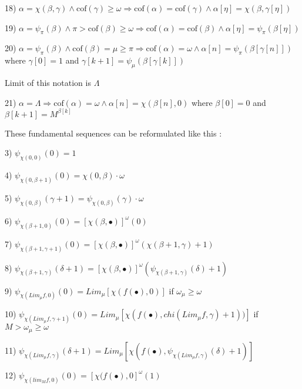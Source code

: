 \documentclass[10pt]{article}
\begin{document}
\bigskip

18) \(\alpha=\chi(\beta,\gamma) \wedge \text{cof}(\gamma)\geq\omega \Rightarrow \text{cof} (\alpha)=\text{cof}(\gamma)\wedge \alpha[\eta]=\chi(\beta,\gamma[\eta])\)

19) \(\alpha=\psi_\pi(\beta) \wedge \pi>\text{cof}(\beta)\geq\omega \Rightarrow \text{cof} (\alpha)= \text{cof}(\beta) \wedge \alpha[\eta]=\psi_\pi(\beta[\eta])\)

20) \(\alpha=\psi_\pi(\beta) \wedge \text{cof}(\beta)=\mu\geq\pi \Rightarrow \text{cof} (\alpha)=\omega \wedge \alpha[n]=\psi _\pi(\beta[\gamma[n]])\) where  \(\gamma[0]=1\) and  \(\gamma[k+1]=\psi_\mu(\beta[\gamma[k]])\)

\bigskip

Limit of this notation is \(\Lambda\)

21) \(\alpha=\Lambda \Rightarrow \text{cof}(\alpha)=\omega \wedge \alpha[n]=\chi(\beta[n],0)\) where \(\beta[0]=0\) and  \(\beta[k+1]=M^{\beta[k]}\)

\bigskip

These fundamental sequences can be reformulated like this :

\bigskip

3) \( \psi_{\chi(0,0)}(0) = 1 \)

4) \( \psi_{\chi(0,\beta+1)}(0) = \chi(0,\beta) \cdot \omega \)

5) \( \psi_{\chi(0,\beta)}(\gamma+1) = \psi_{\chi(0,\beta)}(\gamma) \cdot \omega \)

\bigskip

6) \( \psi_{\chi(\beta+1,0)}(0) = [\chi(\beta,\bullet)]^\omega (0) \)

7) \( \psi_{\chi(\beta+1,\gamma+1)}(0) = [\chi(\beta,\bullet)]^\omega (\chi(\beta+1,\gamma)+1) \)

8) \( \psi_{\chi(\beta+1,\gamma)}(\delta+1) = [\chi(\beta,\bullet)]^\omega (\psi_{\chi(\beta+1,\gamma)}(\delta)+1) \)

\bigskip

9) \( \psi_{\chi(Lim_\mu f,0)}(0) = Lim_\mu [\chi(f(\bullet),0)] \) if \( \omega_\mu \ge \omega \)

10) \( \psi_{\chi(Lim_\mu f,\gamma+1)}(0) = Lim_\mu [\chi(f(\bullet),chi(Lim_\mu f,\gamma)+1))] \) if \( M > \omega_\mu \ge \omega \)

11) \( \psi_{\chi(Lim_\mu f,\gamma)}(\delta+1) = Lim_\mu [\chi(f(\bullet),\psi_{\chi(Lim_\mu f,\gamma)}(\delta)+1)] \)

\bigskip

12) \( \psi_{\chi(lim_M f,0)}(0) = [\chi(f(\bullet),0]^\omega (1) \)
\end{document}
